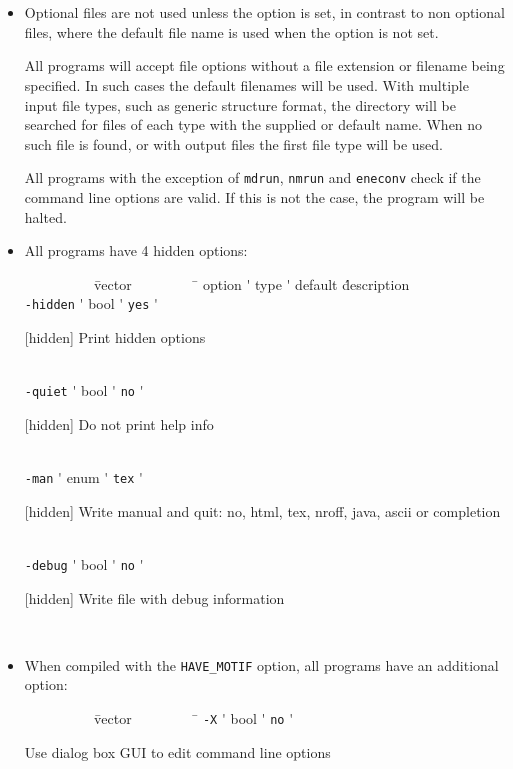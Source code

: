 \section{}

\begin{itemize}
\item
Optional files are not used unless the option is set, in contrast to
non optional files, where the default file name is used when the
option is not set.

All {\gromacs} programs will accept file options without a file extension
or filename being specified. In such cases the default filenames will
be used. With multiple input file types, such as generic structure
format, the directory will be searched for files of each type with the
supplied or default name. When no such file is found, or with output
files the first file type will be used.

All {\gromacs} programs with the exception of {\tt mdrun},
{\tt nmrun} and {\tt eneconv} check if the command line options
are valid. If this is not the case, the program will be halted.

\item
All {\gromacs} programs have 4 hidden options:\\
\vspace{-5ex}
\begin{tabbing}
{\tt ~~~~~~~~~} \= vector \= {\tt ~~~~~~~~} \= \kill
\> option \'\> type \'\> default \' description \\
\> {\tt -hidden} \'\> bool \'\> {\tt    yes} \' \parbox[t]{0.7\linewidth}{[hidden] Print hidden options}\\
\> {\tt -quiet} \'\> bool \'\> {\tt     no} \' \parbox[t]{0.7\linewidth}{[hidden] Do not print help info}\\
\> {\tt -man} \'\> enum \'\> {\tt tex} \' \parbox[t]{0.7\linewidth}{[hidden] Write manual and quit: no, html, tex, nroff, java, ascii or completion}\\
\> {\tt -debug} \'\> bool \'\> {\tt     no} \' \parbox[t]{0.7\linewidth}{[hidden] Write file with debug information}\\
\end{tabbing}
\vspace{-5ex}

\item
When compiled with the {\tt HAVE\_MOTIF} option, all {\gromacs} programs
have an additional option:\\
\vspace{-5ex}
\begin{tabbing}
{\tt ~~~~~~~~~} \= vector \= {\tt ~~~~~~~~} \= \kill
\> {\tt -X} \'\> bool \'\> {\tt     no} \' \parbox[t]{0.7\linewidth}{Use dialog box GUI to edit command line options}\\
\end{tabbing}
\vspace{-5ex}


\end{itemize}
